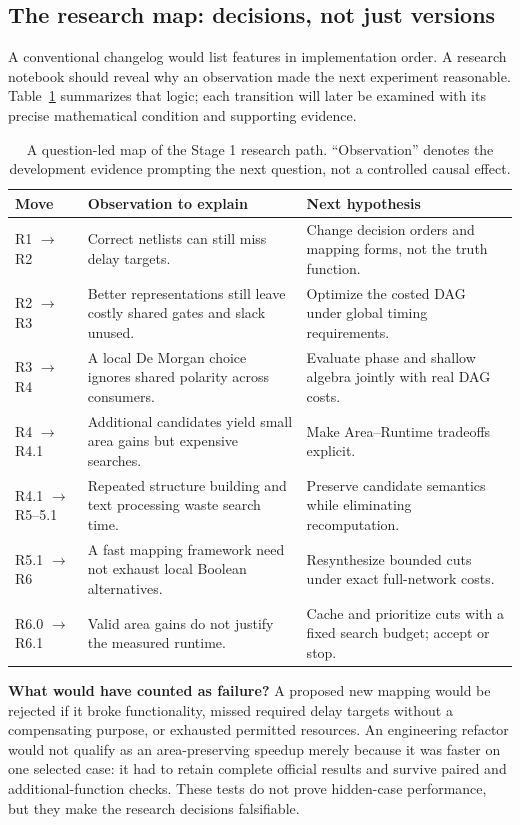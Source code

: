 \subsection{The research map: decisions, not just versions}
A conventional changelog would list features in implementation order. A research notebook should reveal why an observation made the next experiment reasonable. Table~\ref{tab:decisionmap} summarizes that logic; each transition will later be examined with its precise mathematical condition and supporting evidence.
\begin{table}[H]
\centering\footnotesize
\caption{A question-led map of the Stage 1 research path. ``Observation'' denotes the development evidence prompting the next question, not a controlled causal effect.}\label{tab:decisionmap}
\begin{tabularx}{\textwidth}{@{}p{}X X@{}}\toprule
\textbf{Move} & \textbf{Observation to explain} & \textbf{Next hypothesis}\\\midrule
R1 $\to$ R2 & Correct netlists can still miss delay targets. & Change decision orders and mapping forms, not the truth function.\\
R2 $\to$ R3 & Better representations still leave costly shared gates and slack unused. & Optimize the costed DAG under global timing requirements.\\
R3 $\to$ R4 & A local De Morgan choice ignores shared polarity across consumers. & Evaluate phase and shallow algebra jointly with real DAG costs.\\
R4 $\to$ R4.1 & Additional candidates yield small area gains but expensive searches. & Make Area--Runtime tradeoffs explicit.\\
R4.1 $\to$ R5--5.1 & Repeated structure building and text processing waste search time. & Preserve candidate semantics while eliminating recomputation.\\
R5.1 $\to$ R6 & A fast mapping framework need not exhaust local Boolean alternatives. & Resynthesize bounded cuts under exact full-network costs.\\
R6.0 $\to$ R6.1 & Valid area gains do not justify the measured runtime. & Cache and prioritize cuts with a fixed search budget; accept or stop.\\\bottomrule
\end{tabularx}
\end{table}

\noindent\textbf{What would have counted as failure?} A proposed new mapping would be rejected if it broke functionality, missed required delay targets without a compensating purpose, or exhausted permitted resources. An engineering refactor would not qualify as an area-preserving speedup merely because it was faster on one selected case: it had to retain complete official results and survive paired and additional-function checks. These tests do not prove hidden-case performance, but they make the research decisions falsifiable.


